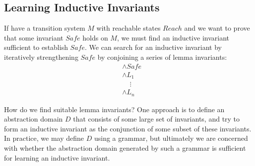 \documentclass[10pt]{article}
\begin{document}
\subsection*{Learning Inductive Invariants}

If have a transition system $M$ with reachable states $Reach$ and we want to prove that some invariant $Safe$ holds on $M$, we must find an inductive invariant sufficient to establish $Safe$. We can search for an inductive invariant by iteratively strengthening $Safe$ by conjoining a series of lemma invariants:
\begin{align*}
    &\wedge Safe \\
    &\wedge L_1 \\
    &\phantom{\wedge}\vdots \\
    &\wedge L_n
\end{align*}

How do we find suitable lemma invariants? One approach is to define an abstraction domain $D$ that consists of some large set of invariants, and try to form an inductive invariant as the conjunction of some subset of these invariants. In practice, we may define $D$ using a grammar, but ultimately we are concerned with whether the abstraction domain generated by such a grammar is sufficient for learning an inductive invariant.
\end{document}
